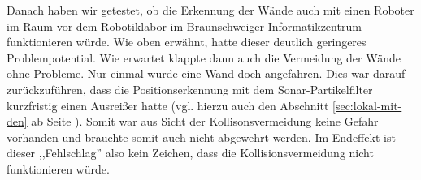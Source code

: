Danach haben wir getestet, ob die Erkennung der Wände auch mit einen
Roboter im Raum vor dem Robotiklabor im Braunschweiger
Informatikzentrum funktionieren würde. Wie oben erwähnt, hatte dieser
deutlich geringeres Problempotential. Wie erwartet klappte dann auch
die Vermeidung der Wände ohne Probleme. Nur einmal wurde eine Wand
doch angefahren. \newpage Dies war darauf zurückzuführen, dass die
Positionserkennung  mit dem Sonar-Partikelfilter kurzfristig einen
Ausreißer hatte (vgl. hierzu auch den Abschnitt
\ref{sec:lokal-mit-den} ab Seite \pageref{sec:lokal-mit-den}). Somit
war aus Sicht der Kollisonsvermeidung keine Gefahr vorhanden und
brauchte somit auch nicht abgewehrt werden. Im Endeffekt ist dieser
,,Fehlschlag'' also kein Zeichen, dass die Kollisionsvermeidung nicht
funktionieren würde. \\\\
%
